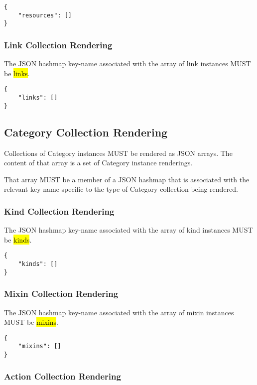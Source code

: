 \documentclass[10pt,a4paper]{article}
\begin{document}
\begin{lstlisting}
{
    "resources": []
}

\end{lstlisting}

\subsubsection{Link Collection Rendering}

The JSON hashmap key-name associated with the array of link instances MUST be \hl{links}.

\begin{lstlisting}
{
    "links": []
}
\end{lstlisting}

\subsection{Category Collection Rendering}
Collections of Category instances MUST be rendered as JSON arrays. The content of that array is a set of Category instance renderings.

That array MUST be a member of a JSON hashmap that is associated with the relevant key name specific to the type of Category collection being rendered.


\subsubsection{Kind Collection Rendering}

The JSON hashmap key-name associated with the array of kind instances MUST be \hl{kinds}.

\begin{lstlisting}
{
    "kinds": []
}
\end{lstlisting}

\subsubsection{Mixin Collection Rendering}

The JSON hashmap key-name associated with the array of mixin instances MUST be \hl{mixins}.

\begin{lstlisting}
{
    "mixins": []
}
\end{lstlisting}

\subsubsection{Action Collection Rendering}
\end{document}
